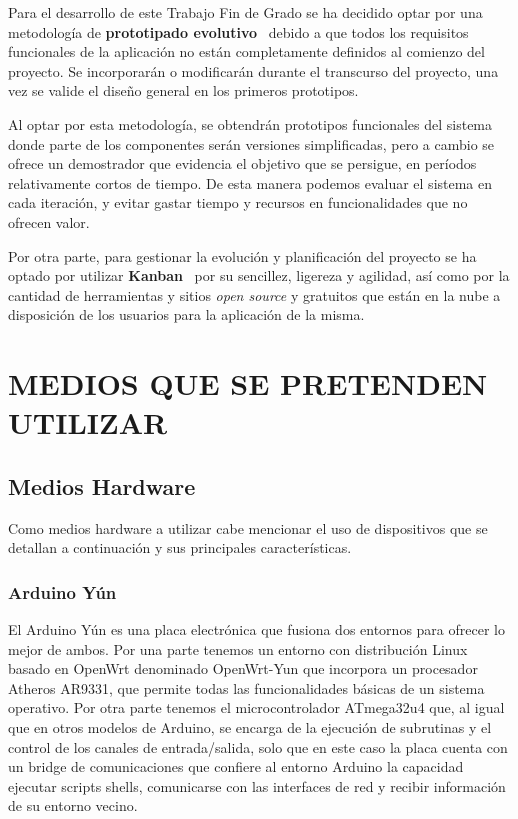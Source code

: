 \documentclass{pre-tfg}
\begin{document}
Para el desarrollo de este Trabajo Fin de Grado se ha decidido optar por una metodología
de \textbf{prototipado evolutivo}~\cite{Pressman} debido a que todos los requisitos
funcionales de la aplicación no están completamente definidos al comienzo del proyecto. Se
incorporarán o modificarán durante el transcurso del proyecto, una vez se valide el
diseño general en los primeros prototipos.

Al optar por esta metodología, se obtendrán prototipos funcionales del sistema donde parte
de los componentes serán versiones simplificadas, pero a cambio se ofrece un demostrador
que evidencia el objetivo que se persigue, en períodos relativamente cortos de tiempo. De
esta manera podemos evaluar el sistema en cada iteración, y evitar gastar tiempo y
recursos en funcionalidades que no ofrecen valor.

Por otra parte, para gestionar la evolución y planificación del proyecto se ha optado por
utilizar \textbf{Kanban}~\cite{Kanban} por su sencillez, ligereza y agilidad, así como por
la cantidad de herramientas y sitios \textit{open source} y gratuitos que están en la nube
a disposición de los usuarios para la aplicación de la misma.


\section{MEDIOS QUE SE PRETENDEN UTILIZAR}

\subsection{Medios Hardware}

Como medios hardware a utilizar  cabe mencionar el uso de dispositivos
que se detallan a continuación y sus principales características.

\subsubsection{Arduino Yún}

El Arduino Yún es una placa  electrónica que fusiona dos entornos para
ofrecer  lo mejor  de  ambos. Por  una parte  tenemos  un entorno  con
distribución  Linux  basado  en  OpenWrt  denominado  OpenWrt-Yun  que
incorpora  un  procesador  Atheros   AR9331,  que  permite  todas  las
funcionalidades  básicas  de un  sistema  operativo.   Por otra  parte
tenemos  el microcontrolador  ATmega32u4 que,  al igual  que en  otros
modelos de  Arduino, se  encarga de  la ejecución  de subrutinas  y el
control de los canales  de entrada/salida, solo que  en este caso la
placa cuenta con  un bridge de comunicaciones que  confiere al entorno
Arduino  la capacidad  ejecutar  scripts shells,  comunicarse con  las
interfaces de red y recibir información de su entorno vecino.
\end{document}

